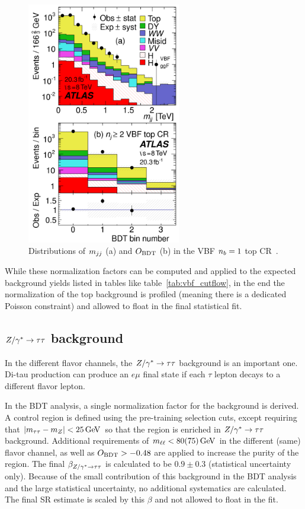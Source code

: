 \begin{figure}[h!]
  \centering
  \captionsetup{justification=centering}
  \includegraphics[width=0.6\textwidth]{figures/VBF_topcr}
  \caption{Distributions of $m_{jj}$ (a) and $O_{\rm BDT}$ (b) in the VBF $n_b = 1$ top CR~\cite{WW2015}.}
  \label{fig:vbf_top_cr}
\end{figure}

While these normalization factors can be computed and applied to the expected background yields listed in tables like table~\ref{tab:vbf_cutflow}, in the end the normalization of the top background is profiled (meaning there is a dedicated Poisson constraint) and allowed to float in the final statistical fit. 

\subsection{$Z/\gamma^{\ast} \to \tau\tau$ background}

In the different flavor channels, the $Z/\gamma^{\ast} \to \tau\tau$ background is an important one. Di-tau production can produce an $e\mu$ final state if each $\tau$ lepton decays to a different flavor lepton. 

In the BDT analysis, a single normalization factor for the background is derived. A control region is defined using the pre-training selection cuts, except requiring that $|\mtt - m_Z| < 25 \GeV$ so that the region is enriched in $Z/\gamma^{\ast} \to \tau\tau$ background. Additional requirements of $\mll < 80 (75) \GeV$ in the different (same) flavor channel, as well as $O_{\rm BDT} > -0.48$ are applied to increase the purity of the region. The final $\beta_{Z/\gamma^{\ast} \to \tau\tau}$ is calculated to be $0.9 \pm 0.3$ (statistical uncertainty only). Because of the small contribution of this background in the BDT analysis and the large statistical uncertainty, no additional systematics are calculated. The final SR estimate is scaled by this $\beta$ and not allowed to float in the fit. 

